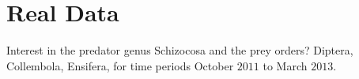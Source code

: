 \section{Real Data}
\label{sec:data}

Interest in the predator genus Schizocosa and the prey orders? Diptera, Collembola, Ensifera, for time periods October $2011$ to March $2013$.  
